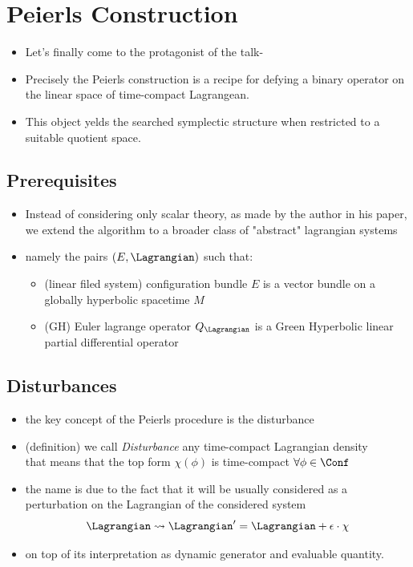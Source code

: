 \documentclass[a4paper,11pt]{scrartcl}
\begin{document}
	\section{Peierls Construction}
	\begin{itemize}
		\item Let's finally come to the protagonist of the talk-
		\item Precisely the Peierls construction is a recipe for defying a binary operator on the linear space of time-compact Lagrangean.
		\item This object yelds the searched symplectic structure when restricted to a suitable quotient space.
	\end{itemize}
	\subsection{Prerequisites}
	\begin{itemize}
		\item Instead of considering only scalar theory, as made by the author in his paper, we extend the algorithm to a broader class of "abstract" lagrangian systems
		\item namely the pairs $(E,\Lagrangian)$ such that:
		\begin{itemize}
			\item (linear filed system) configuration bundle $E$ is a vector bundle on a globally hyperbolic spacetime $M$
			\item (GH) Euler lagrange operator $Q_\Lagrangian$ is a Green Hyperbolic linear partial differential operator
		\end{itemize}
	\end{itemize}
	\subsection{Disturbances}
	\begin{itemize}
		\item the key concept of the Peierls procedure is the disturbance
		\item (definition) we call \emph{Disturbance} any time-compact Lagrangian density\\
		that means that the top form $\chi(\phi) $ is time-compact $\forall \phi \in \Conf$
		\item the name is due to the fact that it will be usually considered as a perturbation on the Lagrangian of the considered system
		$$ \Lagrangian \rightsquigarrow \Lagrangian' = \Lagrangian + \epsilon\cdot \chi$$
		\item on top of its interpretation as dynamic generator and evaluable quantity.
	\end{itemize}
\end{document}
